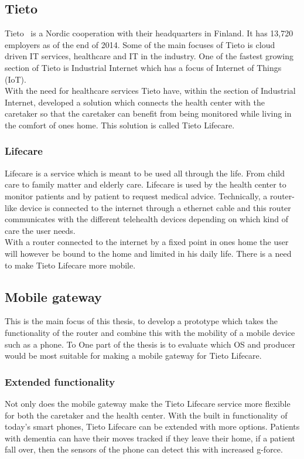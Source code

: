 
\subsection{Tieto}
\label{sub:tieto}
	Tieto~\cite{tieto} is a Nordic cooperation with their headquarters in Finland. It has 13,720 employers as of the end of 2014. Some of the main focuses of Tieto is cloud driven IT services, healthcare and IT in the industry. One of the fastest growing section of Tieto is Industrial Internet which has a focus of Internet of Things (IoT).\\
	With the need for healthcare services Tieto have, within the section of Industrial Internet, developed a solution which connects the health center with the caretaker so that the caretaker can benefit from being monitored while living in the comfort of ones home. This solution is called Tieto Lifecare.

\subsubsection{Lifecare}
\label{subsub:lifecare}
	Lifecare is a service which is meant to be used all through the life. From child care to family matter and elderly care. Lifecare is used by the health center to monitor patients and by patient to request medical advice. Technically, a router-like device is connected to the internet through a ethernet cable and this router communicates with the different telehealth devices depending on which kind of care the user needs.\\
	With a router connected to the internet by a fixed point in ones home the user will however be bound to the home and limited in his daily life. There is a need to make Tieto Lifecare more mobile.

\subsection{Mobile gateway}
\label{sub:gateway}
	This is the main focus of this thesis, to develop a prototype which takes the functionality of the router and combine this with the mobility of a mobile device such as a phone. To 
	One part of the thesis is to evaluate which OS and producer would be most suitable for making a mobile gateway for Tieto Lifecare.
	

\subsubsection{Extended functionality}
\label{subsub:extendedFunc}
	Not only does the mobile gateway make the Tieto Lifecare service more flexible for both the caretaker and the health center. With the built in functionality of today's smart phones, Tieto Lifecare can be extended with more options. Patients with dementia can have their moves tracked if they leave their home, if a patient fall over, then the sensors of the phone can detect this with increased g-force.


